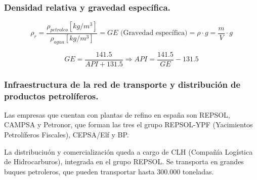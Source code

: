 		\subsubsection{Densidad relativa y gravedad específica.}
			\[\rho_r=\dfrac{\rho_{petroleo}[kg/m^3]}{\rho_{agua}[kg/m^3]} = GE\text{ (Gravedad específica)} = \rho\cdot g = \dfrac{m}{V}\cdot g\]
			
			\[GE = \dfrac{141.5}{API+131.5} \Rightarrow API=\dfrac{141.5}{GE}-131.5\]
			
		\subsubsection{Infraestructura de la red de transporte y distribución de productos petrolíferos.}
			Las empresas que cuentan con plantas de refino en españa son REPSOL, CAMPSA y Petronor, que forman las tres el grupo REPSOL-YPF (Yacimientos Petrolíferos Fiscales), CEPSA/Elf y BP.
			
			
			La distribuciuón y comercialización queda a cargo de CLH (Compañía Logística de Hidrocarburos), integrada en el grupo REPSOL. Se transporta en grandes buques petroleros, que pueden transportar hasta 300.000 toneladas.
			

